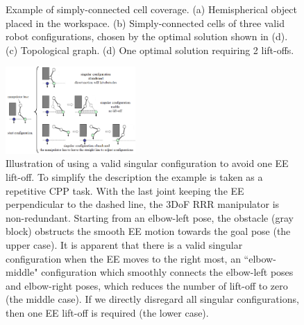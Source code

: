 \documentclass[Afour,sageh,times]{sagej}
\begin{document}
\begin{figure}[t]
\centering
{}
\caption{Example of simply-connected cell coverage. (a) Hemispherical object placed in the workspace. 
(b) Simply-connected cells of three valid robot configurations, chosen by the optimal solution shown in (d). 
(c) Topological graph. (d) One optimal solution requiring 2 lift-offs. 
}\label{fig:TMech}
\end{figure}



\begin{figure}[t]
\centering
\includegraphics[width = 0.44\textwidth]{figures/other_figures/2dof_demo}
\caption{
Illustration of using a valid singular configuration to avoid one EE lift-off. To simplify the description the example is taken as a repetitive CPP task. With the last joint keeping the EE perpendicular to the dashed line, the 3DoF RRR manipulator is non-redundant. Starting from an elbow-left pose, the obstacle (gray block) obstructs the smooth EE motion towards the goal pose (the upper case). 
It is apparent that there is a valid singular configuration when the EE moves to the right most, an ``elbow-middle" configuration which smoothly connects the elbow-left poses and elbow-right poses, which reduces the number of lift-off to zero (the middle case). 
If we directly disregard all singular configurations, then one EE lift-off is required (the lower case). 
}\label{fig_2dof_demo}
\end{figure}
\end{document}
